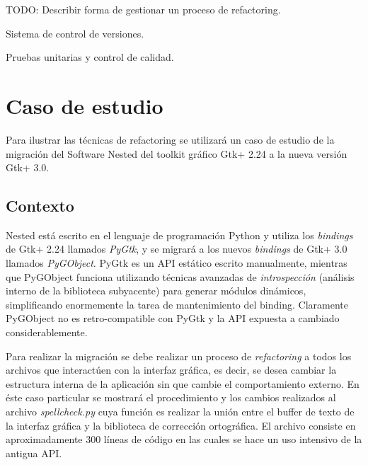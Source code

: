 \documentclass{article}
\begin{document}
TODO: Describir forma de gestionar un proceso de refactoring.

\begin{compactitem}
\item Sistema de control de versiones.
\item Pruebas unitarias y control de calidad.
\end{compactitem}

\newpage


\hypertarget{caso_de_estudio}{}
\section{Caso de estudio}

Para ilustrar las técnicas de refactoring se utilizará un caso de estudio de la migración 
del Software Nested\footnotemark{} del toolkit gráfico Gtk+\footnotemark{} 2.24 a la nueva versión Gtk+ 3.0.

\addtocounter{footnote}{-2}

\hypertarget{contexto}{}
\subsection{Contexto}

Nested está escrito en el lenguaje de programación Python y utiliza los \textit{bindings}\footnotemark{} de Gtk+ 2.24 
llamados \textit{PyGtk}, y se migrará a los nuevos \textit{bindings} de Gtk+ 3.0 llamados \textit{PyGObject}. 
PyGtk es un API estático escrito manualmente, mientras que PyGObject funciona utilizando técnicas 
avanzadas de \textit{introspección} (análisis interno de la biblioteca subyacente) para generar módulos 
dinámicos, simplificando enormemente la tarea de mantenimiento del binding. Claramente PyGObject no 
es retro-compatible con PyGtk y la API expuesta a cambiado considerablemente. 

Para realizar la migración se debe realizar un proceso de \textit{refactoring} a todos los archivos que 
interactúen con la interfaz gráfica, es decir, se desea cambiar la estructura interna de la
aplicación sin que cambie el comportamiento externo. En éste caso particular se mostrará el procedimiento 
y los cambios realizados al archivo \textit{spellcheck.py} cuya función es realizar la unión entre el buffer 
de texto de la interfaz gráfica y la biblioteca de corrección ortográfica. El archivo consiste en 
aproximadamente 300 líneas de código en las cuales se hace un uso intensivo de la antigua API.
\end{document}
